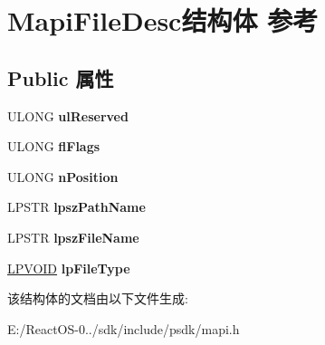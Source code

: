 \hypertarget{struct_mapi_file_desc}{}\section{Mapi\+File\+Desc结构体 参考}
\label{struct_mapi_file_desc}
\subsection*{Public 属性}
\begin{DoxyCompactItemize}
\item 
\mbox{\label{struct_mapi_file_desc_adb18fcdad8df1d6ebd667724d800521b}} 
U\+L\+O\+NG {\bfseries ul\+Reserved}
\item 
\mbox{\label{struct_mapi_file_desc_aef20a0dbb8b1a144b7d4250d51b69bbb}} 
U\+L\+O\+NG {\bfseries fl\+Flags}
\item 
\mbox{\label{struct_mapi_file_desc_a13de3335e76007333312ab32e972a07f}} 
U\+L\+O\+NG {\bfseries n\+Position}
\item 
\mbox{\label{struct_mapi_file_desc_a71d0a445e37fa7b41c67feb3a61c965d}} 
L\+P\+S\+TR {\bfseries lpsz\+Path\+Name}
\item 
\mbox{\label{struct_mapi_file_desc_ada08a005b6ffdcdb360fdf64ddafa1c2}} 
L\+P\+S\+TR {\bfseries lpsz\+File\+Name}
\item 
\mbox{\label{struct_mapi_file_desc_a0131245103034f66479048a2892f9920}} 
\hyperlink{interfacevoid}{L\+P\+V\+O\+ID} {\bfseries lp\+File\+Type}
\end{DoxyCompactItemize}


该结构体的文档由以下文件生成\+:\begin{DoxyCompactItemize}
\item 
E\+:/\+React\+O\+S-\/0../sdk/include/psdk/mapi.\+h\end{DoxyCompactItemize}
